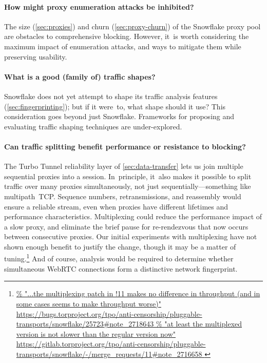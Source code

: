\documentclass[letterpaper,twocolumn]{article}
\newlength{\urlfootnotesize}
\newcommand{\urlfootnote}[1]{\footnote{
\raggedright\hangindent\footnotemargin%
\fontsize{\urlfootnotesize}{\urlfootnotesize}\selectfont%
\url{#1}
}}
\begin{document}
\paragraph{How might proxy enumeration attacks be inhibited?}

The size (\autoref{sec:proxies}) and churn (\autoref{sec:proxy-churn})
of the Snowflake proxy pool
are obstacles to comprehensive blocking.
However, it~is worth considering
the maximum impact of enumeration attacks,
and ways to mitigate them while preserving usability.

\paragraph{What is a good (family of) traffic shapes?}

Snowflake does not yet attempt to shape its
traffic analysis features (\autoref{sec:fingerprinting});
but if it were~to, what shape should it use?
This consideration goes beyond just Snowflake.
Frameworks for proposing and evaluating
traffic shaping techniques are under-explored.

\paragraph{Can traffic splitting benefit performance or resistance to blocking?}

The Turbo Tunnel reliability layer of \autoref{sec:data-transfer}
lets us join multiple sequential proxies into a session.
In~principle,
it~also makes it possible to split traffic
over many proxies simultaneously, not just sequentially---something
like multipath~TCP.
Sequence numbers, retransmissions, and reassembly
would ensure a reliable stream, even when proxies
have different lifetimes and performance characteristics.
Multiplexing could reduce the performance impact of
a slow proxy, and
eliminate the brief pause for re-rendezvous
that now occurs
between consecutive proxies.
Our initial experiments with multiplexing have
not shown enough benefit to justify the change,
though it may be a matter of tuning.\urlfootnote{
https://bugs.torproject.org/tpo/anti-censorship/pluggable-transports/snowflake/25723\#note_2718643
}
And of course, analysis would be required
to determine whether simultaneous WebRTC connections
form a distinctive network fingerprint.
\end{document}
